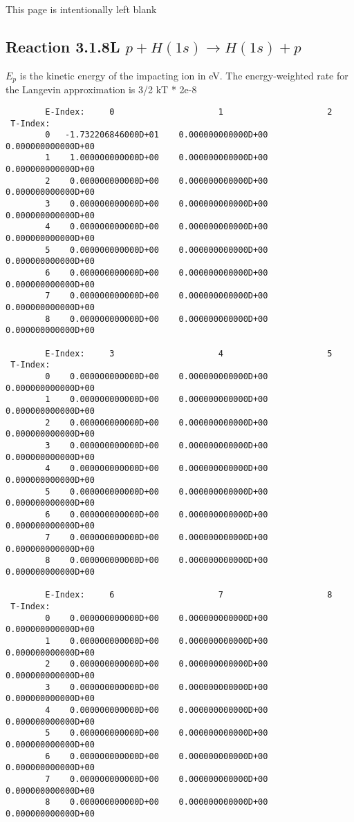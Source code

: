 \documentclass[12pt,dvipdfmx]{article}
\begin{document}
{\newpage
This page is intentionally left blank
\newpage
\subsection{
Reaction 3.1.8L  $p + H(1s)  \rightarrow  H(1s) + p $
}
$E_p$ is the kinetic energy of the impacting ion in eV.
The energy-weighted rate for the Langevin approximation is
3/2 kT * 2e-8

\begin{small}\begin{verbatim}
        E-Index:     0                     1                     2
 T-Index:
        0   -1.732206846000D+01    0.000000000000D+00    0.000000000000D+00
        1    1.000000000000D+00    0.000000000000D+00    0.000000000000D+00
        2    0.000000000000D+00    0.000000000000D+00    0.000000000000D+00
        3    0.000000000000D+00    0.000000000000D+00    0.000000000000D+00
        4    0.000000000000D+00    0.000000000000D+00    0.000000000000D+00
        5    0.000000000000D+00    0.000000000000D+00    0.000000000000D+00
        6    0.000000000000D+00    0.000000000000D+00    0.000000000000D+00
        7    0.000000000000D+00    0.000000000000D+00    0.000000000000D+00
        8    0.000000000000D+00    0.000000000000D+00    0.000000000000D+00

        E-Index:     3                     4                     5
 T-Index:
        0    0.000000000000D+00    0.000000000000D+00    0.000000000000D+00
        1    0.000000000000D+00    0.000000000000D+00    0.000000000000D+00
        2    0.000000000000D+00    0.000000000000D+00    0.000000000000D+00
        3    0.000000000000D+00    0.000000000000D+00    0.000000000000D+00
        4    0.000000000000D+00    0.000000000000D+00    0.000000000000D+00
        5    0.000000000000D+00    0.000000000000D+00    0.000000000000D+00
        6    0.000000000000D+00    0.000000000000D+00    0.000000000000D+00
        7    0.000000000000D+00    0.000000000000D+00    0.000000000000D+00
        8    0.000000000000D+00    0.000000000000D+00    0.000000000000D+00

        E-Index:     6                     7                     8
 T-Index:
        0    0.000000000000D+00    0.000000000000D+00    0.000000000000D+00
        1    0.000000000000D+00    0.000000000000D+00    0.000000000000D+00
        2    0.000000000000D+00    0.000000000000D+00    0.000000000000D+00
        3    0.000000000000D+00    0.000000000000D+00    0.000000000000D+00
        4    0.000000000000D+00    0.000000000000D+00    0.000000000000D+00
        5    0.000000000000D+00    0.000000000000D+00    0.000000000000D+00
        6    0.000000000000D+00    0.000000000000D+00    0.000000000000D+00
        7    0.000000000000D+00    0.000000000000D+00    0.000000000000D+00
        8    0.000000000000D+00    0.000000000000D+00    0.000000000000D+00


\end{verbatim}
\end{small}}
\end{document}
